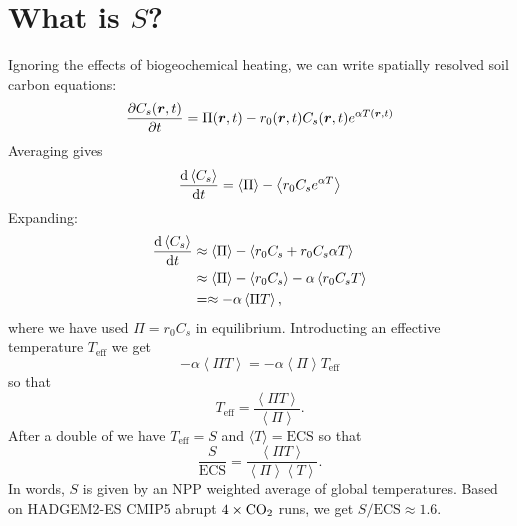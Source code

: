 \section{What is $S$?}
Ignoring the effects of biogeochemical heating, we can write spatially resolved soil carbon equations:
\begin{equation}
  \label{eq:spatially_resolved_soil_carbon}
  \pdv{C_s(\bm{r},t)}{t} = \Pi(\bm{r},t) - r_0(\bm{r},t)C_s(\bm{r},t)e^{\alpha T(\bm{r},t)}
\end{equation}
Averaging gives
\begin{equation}
  \label{eq:spatially_averaged_soil_carbon}
  \dv{\left\langle C_s\right\rangle}{t} = \left\langle \Pi \right \rangle - \left\langle r_0 C_s e^{\alpha T} \right \rangle
\end{equation}
Expanding:
\begin{align*}
  \dv{\left\langle C_s\right\rangle}{t} &\approx \left\langle \Pi \right \rangle - \left\langle r_0 C_s + r_0 C_s \alpha T \right \rangle \\
                                        &\approx \left\langle \Pi \right \rangle - \left\langle r_0 C_s\right \rangle - \alpha \left \langle r_0C_s T\right\rangle \\
                                        &=\approx - \alpha \left \langle \Pi T\right\rangle,
\end{align*}
where we have used $\Pi = r_0C_s$ in equilibrium. Introducting an effective temperature $T_{\mathrm{eff}}$ we get
\begin{equation*}
  - \alpha \left \langle \Pi T \right\rangle = - \alpha \left \langle \Pi \right\rangle T_{\mathrm{eff}}
\end{equation*}
so that
\begin{equation}
  \label{eq:definition_of_effective_temperature}
  T_{\mathrm{eff}} = \frac{\left \langle \Pi T \right\rangle}{\left \langle \Pi \right\rangle}.
\end{equation}
After a double of  we have $T_{\mathrm{eff}} = S$ and $\langle T \rangle = \mathrm{ECS}$ so that
\begin{equation}
  \label{eq:S_vs_ECS}
  \frac{S}{\mathrm{ECS}} = \frac{\left \langle \Pi T \right\rangle}{\left \langle \Pi \right\rangle \left \langle T \right \rangle}.
\end{equation}
In words, $S$ is given by an NPP weighted average of global temperatures.
Based on HADGEM2-ES CMIP5 abrupt $4\times\ce{CO2}$ runs, we get $S/\mathrm{ECS} \approx 1.6$.

